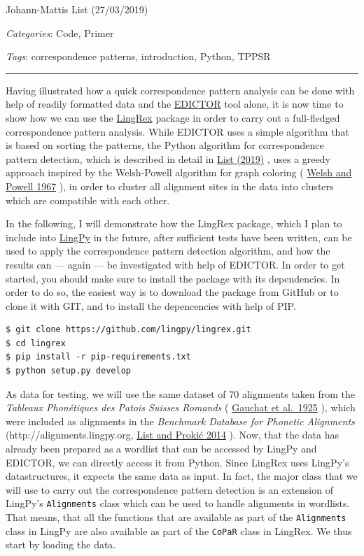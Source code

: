 \documentclass[
  a4paper,
  14pt,
  oneside,
  tablecaptionabove
]{scrbook}
\newcommand{\passthrough}[1]{#1}
\begin{document}
Johann-Mattis List (27/03/2019)

\emph{Categories}: Code, Primer

\emph{Tags}: correspondence patterns, introduction, Python, TPPSR

\begin{center}\rule{0.5\linewidth}{1pt}\end{center}


Having illustrated how a quick correspondence pattern analysis can be
done with help of readily formatted data and the
\href{http://edictor.digling.org}{EDICTOR} tool alone, it is now time to
show how we can use the
\href{https://github.com/lingpy/lingrex}{LingRex} package in order to
carry out a full-fledged correspondence pattern analysis. While EDICTOR
uses a simple algorithm that is based on sorting the patterns, the
Python algorithm for correspondence pattern detection, which is
described in detail in
\href{http://bibliography.lingpy.org?key=List2019a}{List (2019)} , uses
a greedy approach inspired by the Welsh-Powell algorithm for graph
coloring ( \href{http://bibliography.lingpy.org?key=Welsh1967}{Welsh and
Powell 1967} ), in order to cluster all alignment sites in the data into
clusters which are compatible with each other.

In the following, I will demonstrate how the LingRex package, which I
plan to include into \href{http://lingpy.org}{LingPy} in the future,
after sufficient tests have been written, can be used to apply the
correspondence pattern detection algorithm, and how the results can ---
again --- be investigated with help of EDICTOR. In order to get started,
you should make sure to install the package with its dependencies. In
order to do so, the easiest way is to download the package from GitHub
or to clone it with GIT, and to install the depencencies with help of
PIP.

\begin{lstlisting}
$ git clone https://github.com/lingpy/lingrex.git
$ cd lingrex
$ pip install -r pip-requirements.txt
$ python setup.py develop
\end{lstlisting}

As data for testing, we will use the same dataset of 70 alignments taken
from the \emph{Tableaux Phonétiques des Patois Suisses Romands} (
\href{http://bibliography.lingpy.org?key=Gauchat1925}{Gauchat et
al.~1925} ), which were included as alignments in the \emph{Benchmark
Database for Phonetic Alignments} (http://alignments.lingpy.org,
\href{http://bibliography.lingpy.org?key=List2014e}{List and Prokić
2014} ). Now, that the data has already been prepared as a wordlist that
can be accessed by LingPy and EDICTOR, we can directly access it from
Python. Since LingRex uses LingPy's datastructures, it expects the same
data as input. In fact, the major class that we will use to carry out
the correspondence pattern detection is an extension of LingPy's
\passthrough{\lstinline!Alignments!} class which can be used to handle
alignments in wordlists. That means, that all the functions that are
available as part of the \passthrough{\lstinline!Alignments!} class in
LingPy are also available as part of the \passthrough{\lstinline!CoPaR!}
class in LingRex. We thus start by loading the data.
\end{document}
